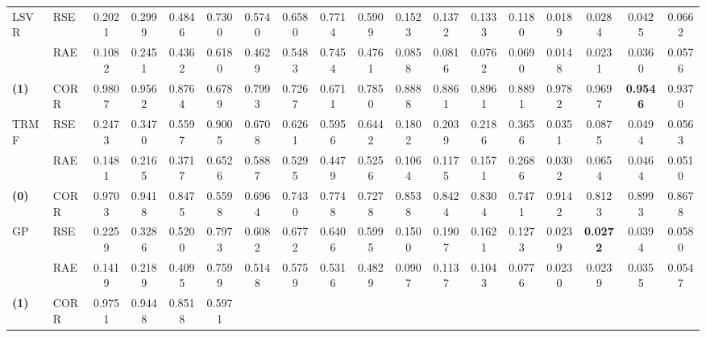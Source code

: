 \begin{table*}[!ht]
{\begin{tabular}{ll|cccc|cccc|cccc|cccc}
\midrule
\multirow{2}{*}{LSVR} & RSE 
							& 0.2021 & 0.2999 & 0.4846 & 0.7300 
                            & 0.5740 & 0.6580 & 0.7714 & 0.5909
                            & 0.1523 & 0.1372 & 0.1333 & 0.1180 
                            & 0.0189 & 0.0284 & 0.0425 & 0.0662 \\
					  & RAE  
                      		& 0.1082 & 0.2451 & 0.4362 & 0.6180 
                            & 0.4629 & 0.5483 & 0.7454 & 0.4761
                            & 0.0858 & 0.0816 & 0.0762 & 0.0690
                            & 0.0148 & 0.0231 & 0.0360 & 0.0576 \\
\textbf{(1)}                & CORR 
                     		& 0.9807 & 0.9562 & 0.8764 & 0.6789 
                            & 0.7993 & 0.7267 & 0.6711 & 0.7850 
                            & 0.8888 & 0.8861 & 0.8961 & 0.8891 
                            & 0.9782 & 0.9697 & \textbf{0.9546} & 0.9370 \\   
\midrule
\multirow{2}{*}{TRMF} & RSE 
							& 0.2473 & 0.3470 & 0.5597 & 0.9005 
                            & 0.6708 & 0.6261 & 0.5956 & 0.6442
                            & 0.1802 & 0.2039 & 0.2186 & 0.3656 
                            & 0.0351 & 0.0875 & 0.0494 & 0.0563 \\
					  & RAE 
                      		& 0.1481 & 0.2165 & 0.3717 & 0.6526
                            & 0.5887 & 0.5295 & 0.4479 & 0.5256 
                            & 0.1064 & 0.1175 & 0.1571 & 0.2686 
                            & 0.0302 & 0.0654 & 0.0464 & 0.0510\\
\textbf{(0)}         & CORR 
                     		& 0.9703 & 0.9418 & 0.8475 & 0.5598
                            & 0.6964 & 0.7430 & 0.7748 & 0.7278 
                            & 0.8538 & 0.8424 & 0.8304 & 0.7471 
                            & 0.9142 & 0.8123 & 0.8993 & 0.8678 \\
\midrule
\multirow{2}{*}{GP} & RSE 
						  & 0.2259 & 0.3286 & 0.5200 & 0.7973
                          & 0.6082 & 0.6772 & 0.6406 & 0.5995
                          & 0.1500 & 0.1907 & 0.1621 & 0.1273 
                          & 0.0239 & \textbf{0.0272} & 0.0394 & 0.0580 \\
					& RAE 
                      	  & 0.1419 & 0.2189 & 0.4095 & 0.7599
                          & 0.5148 & 0.5759 & 0.5316 & 0.4829
                          & 0.0907 & 0.1137 & 0.1043 & 0.0776
                          & 0.0230 & 0.0239 & 0.0355 & 0.0547 \\
\textbf{(1)}              & CORR 
                   		  & 0.9751 & 0.9448 & 0.8518 & 0.5971

\end{tabular}}
\end{table*}
